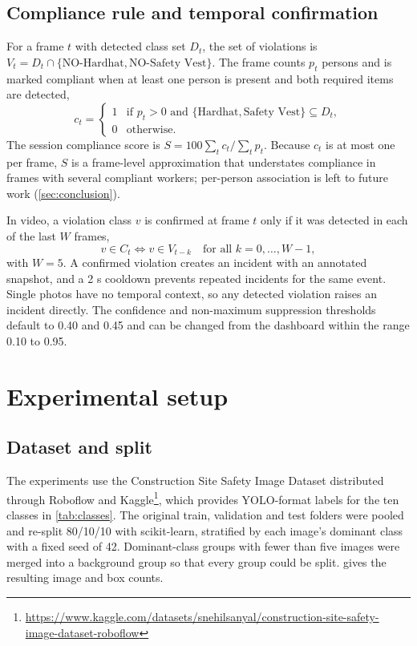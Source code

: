 \documentclass[preprint,12pt]{elsarticle}
\begin{document}
\subsection{Compliance rule and temporal confirmation}

For a frame $t$ with detected class set $D_t$, the set of violations is $V_t = D_t \cap \{\text{NO-Hardhat}, \text{NO-Safety Vest}\}$. The frame counts $p_t$ persons and is marked compliant when at least one person is present and both required items are detected,
\begin{equation}
c_t = \begin{cases} 1 & \text{if } p_t > 0 \text{ and } \{\text{Hardhat}, \text{Safety Vest}\} \subseteq D_t, \\ 0 & \text{otherwise.} \end{cases}
\label{eq:compliance}
\end{equation}
The session compliance score is $S = 100 \sum_t c_t / \sum_t p_t$. Because $c_t$ is at most one per frame, $S$ is a frame-level approximation that understates compliance in frames with several compliant workers; per-person association is left to future work (\cref{sec:conclusion}).

In video, a violation class $v$ is confirmed at frame $t$ only if it was detected in each of the last $W$ frames,
\begin{equation}
v \in C_t \iff v \in V_{t-k} \quad \text{for all } k = 0, \ldots, W-1,
\label{eq:temporal}
\end{equation}
with $W = 5$. A confirmed violation creates an incident with an annotated snapshot, and a 2 s cooldown prevents repeated incidents for the same event. Single photos have no temporal context, so any detected violation raises an incident directly. The confidence and non-maximum suppression thresholds default to 0.40 and 0.45 and can be changed from the dashboard within the range 0.10 to 0.95.

\section{Experimental setup}
\label{sec:setup}

\subsection{Dataset and split}

The experiments use the Construction Site Safety Image Dataset distributed through Roboflow and Kaggle\footnote{\url{https://www.kaggle.com/datasets/snehilsanyal/construction-site-safety-image-dataset-roboflow}}, which provides YOLO-format labels for the ten classes in \cref{tab:classes}. The original train, validation and test folders were pooled and re-split 80/10/10 with scikit-learn, stratified by each image's dominant class with a fixed seed of 42. Dominant-class groups with fewer than five images were merged into a background group so that every group could be split.  gives the resulting image and box counts.
\end{document}
